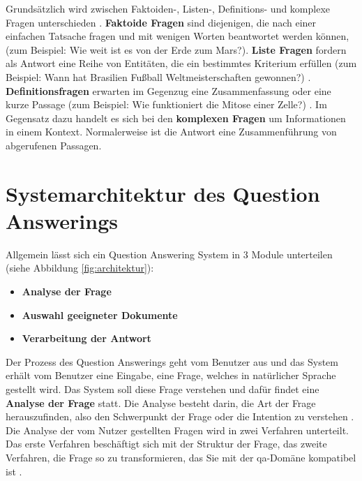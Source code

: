 \documentclass[
        ngerman,
        paper=a4,
        numbers=noendperiod,
]{scrreprt}
\begin{document}
Grundsätzlich wird zwischen Faktoiden-, Listen-, Definitions- und komplexe Fragen unterschieden \citep{Kolomiyets2011APerspective}. \textbf{Faktoide Fragen} sind diejenigen, die nach einer einfachen Tatsache fragen und mit wenigen Worten beantwortet werden können, (zum Beispiel: Wie weit ist es von der Erde zum Mars?). \textbf{Liste Fragen} fordern als Antwort eine Reihe von Entitäten, die ein bestimmtes Kriterium erfüllen (zum Beispiel: Wann hat Brasilien Fußball Weltmeisterschaften gewonnen?) \citep{Heie2012QuestionModelling}. \textbf{Definitionsfragen} erwarten im Gegenzug eine Zusammenfassung oder eine kurze Passage (zum Beispiel: Wie funktioniert die Mitose einer Zelle?) \citep{Neves2015QuestionBiology}. Im Gegensatz dazu handelt es sich bei den \textbf{komplexen Fragen} um Informationen in einem Kontext. Normalerweise ist die Antwort eine Zusammenführung von abgerufenen Passagen.


\section{Systemarchitektur des Question Answerings} %

%

Allgemein lässt sich ein Question Answering System in 3 Module unterteilen (siehe Abbildung \ref{fig:architektur}):
\begin{itemize}
    \item \textbf{Analyse der Frage}
    \item \textbf{Auswahl geeigneter Dokumente}
    \item \textbf{Verarbeitung der Antwort} 
\end{itemize}

Der Prozess des Question Answerings geht vom Benutzer aus und das System erhält vom Benutzer eine Eingabe, eine Frage, welches in natürlicher Sprache gestellt wird. Das System soll diese Frage verstehen und dafür findet eine \textbf{Analyse der Frage} statt. Die Analyse besteht darin, die Art der Frage herauszufinden, also den Schwerpunkt der Frage oder die Intention zu verstehen \citep{Malik2013DomainSystem}. Die Analyse der vom Nutzer gestellten Fragen wird in zwei Verfahren unterteilt. Das erste Verfahren beschäftigt sich mit der Struktur der Frage, das zweite Verfahren, die Frage so zu transformieren, das Sie mit der \ac{qa}-Domäne kompatibel ist \citep{Hamed2016AClassification}.
\end{document}
